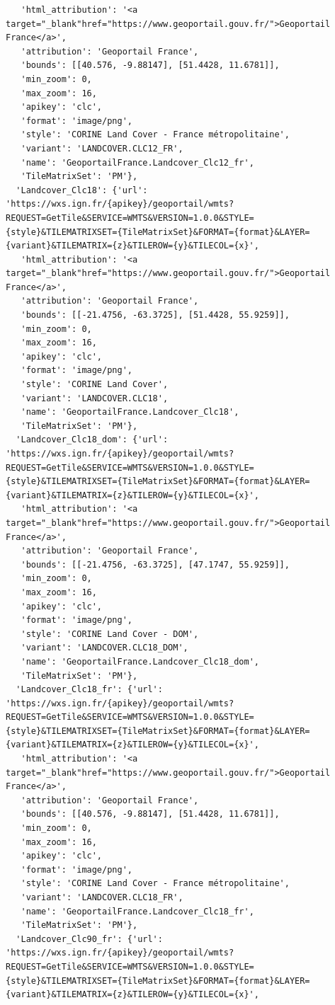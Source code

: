 \documentclass[
  letterpaper,
  DIV=11,
  numbers=noendperiod]{scrreprt}
\begin{document}
\begin{verbatim}
   'html_attribution': '<a target="_blank"href="https://www.geoportail.gouv.fr/">Geoportail France</a>',
   'attribution': 'Geoportail France',
   'bounds': [[40.576, -9.88147], [51.4428, 11.6781]],
   'min_zoom': 0,
   'max_zoom': 16,
   'apikey': 'clc',
   'format': 'image/png',
   'style': 'CORINE Land Cover - France métropolitaine',
   'variant': 'LANDCOVER.CLC12_FR',
   'name': 'GeoportailFrance.Landcover_Clc12_fr',
   'TileMatrixSet': 'PM'},
  'Landcover_Clc18': {'url': 'https://wxs.ign.fr/{apikey}/geoportail/wmts?REQUEST=GetTile&SERVICE=WMTS&VERSION=1.0.0&STYLE={style}&TILEMATRIXSET={TileMatrixSet}&FORMAT={format}&LAYER={variant}&TILEMATRIX={z}&TILEROW={y}&TILECOL={x}',
   'html_attribution': '<a target="_blank"href="https://www.geoportail.gouv.fr/">Geoportail France</a>',
   'attribution': 'Geoportail France',
   'bounds': [[-21.4756, -63.3725], [51.4428, 55.9259]],
   'min_zoom': 0,
   'max_zoom': 16,
   'apikey': 'clc',
   'format': 'image/png',
   'style': 'CORINE Land Cover',
   'variant': 'LANDCOVER.CLC18',
   'name': 'GeoportailFrance.Landcover_Clc18',
   'TileMatrixSet': 'PM'},
  'Landcover_Clc18_dom': {'url': 'https://wxs.ign.fr/{apikey}/geoportail/wmts?REQUEST=GetTile&SERVICE=WMTS&VERSION=1.0.0&STYLE={style}&TILEMATRIXSET={TileMatrixSet}&FORMAT={format}&LAYER={variant}&TILEMATRIX={z}&TILEROW={y}&TILECOL={x}',
   'html_attribution': '<a target="_blank"href="https://www.geoportail.gouv.fr/">Geoportail France</a>',
   'attribution': 'Geoportail France',
   'bounds': [[-21.4756, -63.3725], [47.1747, 55.9259]],
   'min_zoom': 0,
   'max_zoom': 16,
   'apikey': 'clc',
   'format': 'image/png',
   'style': 'CORINE Land Cover - DOM',
   'variant': 'LANDCOVER.CLC18_DOM',
   'name': 'GeoportailFrance.Landcover_Clc18_dom',
   'TileMatrixSet': 'PM'},
  'Landcover_Clc18_fr': {'url': 'https://wxs.ign.fr/{apikey}/geoportail/wmts?REQUEST=GetTile&SERVICE=WMTS&VERSION=1.0.0&STYLE={style}&TILEMATRIXSET={TileMatrixSet}&FORMAT={format}&LAYER={variant}&TILEMATRIX={z}&TILEROW={y}&TILECOL={x}',
   'html_attribution': '<a target="_blank"href="https://www.geoportail.gouv.fr/">Geoportail France</a>',
   'attribution': 'Geoportail France',
   'bounds': [[40.576, -9.88147], [51.4428, 11.6781]],
   'min_zoom': 0,
   'max_zoom': 16,
   'apikey': 'clc',
   'format': 'image/png',
   'style': 'CORINE Land Cover - France métropolitaine',
   'variant': 'LANDCOVER.CLC18_FR',
   'name': 'GeoportailFrance.Landcover_Clc18_fr',
   'TileMatrixSet': 'PM'},
  'Landcover_Clc90_fr': {'url': 'https://wxs.ign.fr/{apikey}/geoportail/wmts?REQUEST=GetTile&SERVICE=WMTS&VERSION=1.0.0&STYLE={style}&TILEMATRIXSET={TileMatrixSet}&FORMAT={format}&LAYER={variant}&TILEMATRIX={z}&TILEROW={y}&TILECOL={x}',

\end{verbatim}
\end{document}
